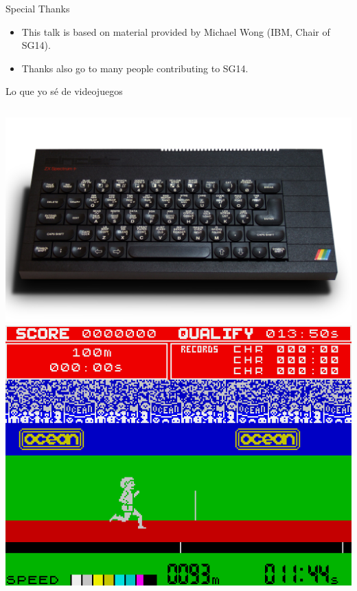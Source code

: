 \begin{frame}[t]{Special Thanks}
\begin{itemize}
  \item This talk is based on material provided by Michael Wong (IBM, Chair of SG14).
  \item Thanks also go to many people contributing to SG14.
\end{itemize}
\end{frame}

\begin{frame}[t]{Lo que yo sé de videojuegos}
\pause
\begin{columns}[T]


\includegraphics[width=.7\textwidth]{figs/zx-spectrum}
\vspace{1cm}
\includegraphics[width=.7\textwidth]{figs/decathlon}



\end{columns}
\end{frame}
